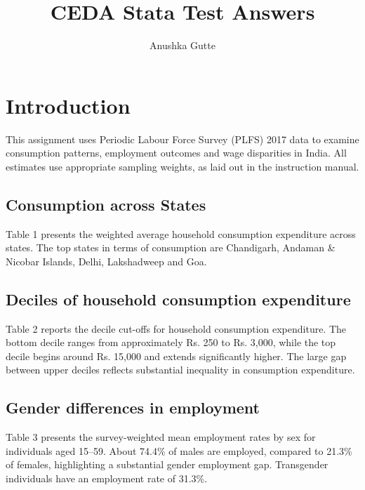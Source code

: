 \documentclass[12pt,a4paper]{article}
\begin{document}
\title{CEDA Stata Test Answers}
\author{Anushka Gutte}
\maketitle


\section{Introduction}

This assignment uses Periodic Labour Force Survey (PLFS) 2017 data to examine consumption patterns, employment outcomes and wage disparities in India. All estimates use appropriate sampling weights, as laid out in the instruction manual.

\subsection{Consumption across States}

Table 1 presents the weighted average household consumption expenditure across states. The top states in terms of consumption are Chandigarh, Andaman \& Nicobar Islands, Delhi, Lakshadweep and Goa.

\label{tab:state_consumption}

\subsection{Deciles of household consumption expenditure}

 Table 2 reports the decile cut-offs for household consumption expenditure. The bottom decile ranges from approximately Rs. 250 to Rs. 3,000, while the top decile begins around Rs. 15,000 and extends significantly higher. The large gap between upper deciles reflects substantial inequality in consumption expenditure.



\subsection{Gender differences in employment}

Table 3 presents the survey-weighted mean employment rates by sex for individuals aged 15–59. About 74.4\% of males are employed, compared to 21.3\% of females, highlighting a substantial gender employment gap. Transgender individuals have an employment rate of 31.3\%.


\end{document}
